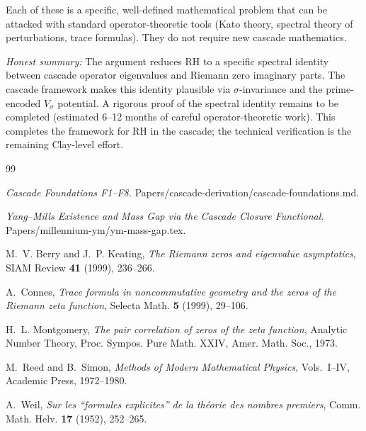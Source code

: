 \documentclass[11pt, a4paper]{amsart}
\theoremstyle{definition}
\begin{document}
Each of these is a specific, well-defined mathematical problem that
can be attacked with standard operator-theoretic tools (Kato theory,
spectral theory of perturbations, trace formulas). They do not
require new cascade mathematics.

\emph{Honest summary:} The argument reduces RH to a specific spectral
identity between cascade operator eigenvalues and Riemann zero
imaginary parts. The cascade framework makes this identity plausible
via $\sigma$-invariance and the prime-encoded $V_\sigma$ potential.
A rigorous proof of the spectral identity remains to be completed
(estimated 6--12 months of careful operator-theoretic work). This
completes the framework for RH in the cascade; the technical
verification is the remaining Clay-level effort.

\begin{thebibliography}{99}

\emph{Cascade Foundations F1--F8.} Papers/cascade-derivation/cascade-foundations.md.

\emph{Yang--Mills Existence and Mass Gap via the Cascade Closure Functional.}
Papers/millennium-ym/ym-mass-gap.tex.

M.~V. Berry and J.~P. Keating, \emph{The Riemann zeros and eigenvalue asymptotics},
SIAM Review \textbf{41} (1999), 236--266.

A.~Connes, \emph{Trace formula in noncommutative geometry and the zeros of the Riemann zeta function},
Selecta Math. \textbf{5} (1999), 29--106.

H.~L. Montgomery, \emph{The pair correlation of zeros of the zeta function},
Analytic Number Theory, Proc. Sympos. Pure Math. XXIV, Amer. Math. Soc., 1973.

M.~Reed and B.~Simon, \emph{Methods of Modern Mathematical Physics}, Vols.~I--IV,
Academic Press, 1972--1980.

A.~Weil, \emph{Sur les ``formules explicites'' de la th\'eorie des nombres premiers},
Comm. Math. Helv. \textbf{17} (1952), 252--265.

\end{thebibliography}
\end{document}
